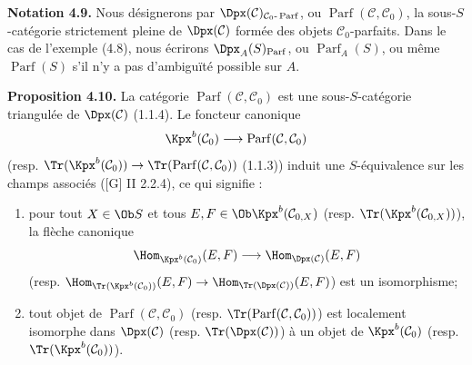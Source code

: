 \documentclass[11pt]{article}
\newcommand{\Parf}{\operatorname{Parf}}
\begin{document}
\textbf{Notation 4.9.} Nous désignerons par \(\Dpx(\mathcal C)_{\mathcal C_0\text{-}\Parf}\), ou \(\Parf(\mathcal C,\mathcal C_0)\), la sous-\(S\)-catégorie strictement pleine de \(\Dpx(\mathcal C)\) formée des objets \(\mathcal C_0\)-parfaits. Dans le cas de l'exemple (4.8), nous écrirons \(\Dpx_A(S)_{\Parf}\), ou \(\Parf_A(S)\), ou même \(\Parf(S)\) s'il n'y a pas d'ambiguïté possible sur \(A\).

\textbf{Proposition 4.10.} La catégorie \(\Parf(\mathcal C,\mathcal C_0)\) est une sous-\(S\)-catégorie triangulée de \(\Dpx(\mathcal C)\) (1.1.4). Le foncteur canonique
\[
  \Kpx^b(\mathcal C_0)\longrightarrow\Parf(\mathcal C,\mathcal C_0)
\]
(resp. \(\Tr(\Kpx^b(\mathcal C_0))\to\Tr(\Parf(\mathcal C,\mathcal C_0))\) (1.1.3)) induit une \(S\)-équivalence sur les champs associés ([G] II 2.2.4), ce qui signifie :
\begin{enumerate}[label=(\roman*)]
\item pour tout \(X\in\Ob S\) et tous \(E,F\in\Ob\Kpx^b(\mathcal C_{0,X})\) (resp. \(\Tr(\Kpx^b(\mathcal C_{0,X}))\)), la flèche canonique
\[
  \Hom_{\Kpx^b(\mathcal C_0)}(E,F)
  \longrightarrow
  \Hom_{\Dpx(\mathcal C)}(E,F)
\]
(resp. \(\Hom_{\Tr(\Kpx^b(\mathcal C_0))}(E,F)\to\Hom_{\Tr(\Dpx(\mathcal C))}(E,F)\)) est un isomorphisme;
\item tout objet de \(\Parf(\mathcal C,\mathcal C_0)\) (resp. \(\Tr(\Parf(\mathcal C,\mathcal C_0))\)) est localement isomorphe dans \(\Dpx(\mathcal C)\) (resp. \(\Tr(\Dpx(\mathcal C))\)) à un objet de \(\Kpx^b(\mathcal C_0)\) (resp. \(\Tr(\Kpx^b(\mathcal C_0))\)).
\end{enumerate}
\end{document}
